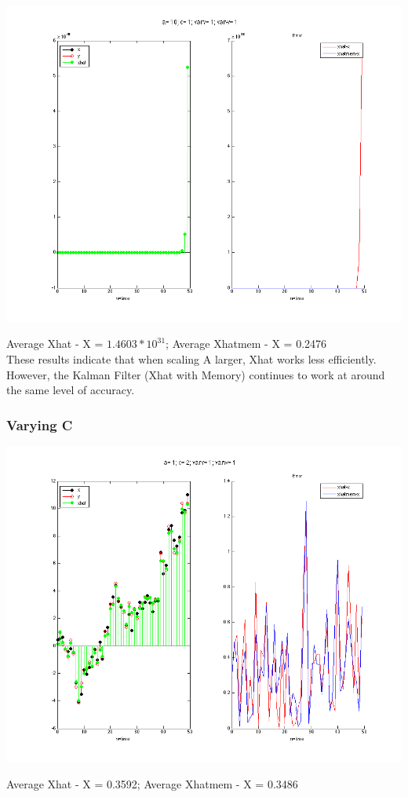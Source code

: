 \documentclass[leqno]{article}
\begin{document}
\begin{center}
\includegraphics[scale=0.3]{fig5}
\end{center}
Average Xhat - X = $1.4603*10^31$; \quad Average Xhatmem - X = 0.2476 \\

These results indicate that when scaling A larger, Xhat works less efficiently. However, the Kalman Filter (Xhat with Memory) continues to work at around the same level of accuracy.

\subsubsection{Varying C}
\begin{center}
\includegraphics[scale=0.3]{fig6}
\end{center}
Average Xhat - X = 0.3592; \quad Average Xhatmem - X = 0.3486\\
\end{document}
